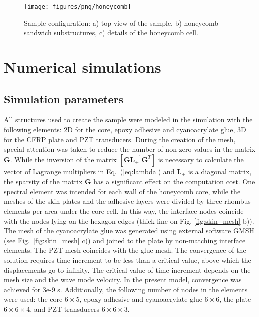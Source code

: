 \documentclass[sensors,article,submit,moreauthors,pdftex]{Definitions/mdpi}
\begin{document}
\begin{figure}
	\begin{center}
		\texttt{[image: figures/png/honeycomb]}
	\end{center}
	\caption{Sample configuration: a) top view of the sample, b) honeycomb sandwich substructures, c) details of the honeycomb cell.}
	\label{fig:honeycomb}
\end{figure}

\section{Numerical simulations}
\label{sec:numerical}
\subsection{Simulation parameters}
\label{sec:simulation}
All structures used to create the sample were modeled in the simulation with the following elements: 2D for the core, epoxy adhesive and cyanoacrylate glue, 3D for the CFRP plate and PZT transducers.
During the creation of the mesh, special attention was taken to reduce the number of non-zero values in the matrix \(\textbf{G}\). While the inversion of the matrix \(\left [\textbf{GL}_+^{-1}\textbf{G}^T\right ]\) is necessary to calculate the vector of Lagrange multipliers in Eq.~(\ref{eq:lambda}) and \(\textbf{L}_+\) is a diagonal matrix, the sparsity of the matrix \(\textbf{G}\) has a significant effect on the computation cost.
One spectral element was intended for each wall of the honeycomb core, while the meshes of the skin plates and the adhesive layers were divided by three rhombus elements per area under the core cell.
In this way, the interface nodes coincide with the nodes lying on the hexagon edges (thick line on Fig. \ref{fig:skin_mesh} b)).
The mesh of the cyanoacrylate glue was generated using external software GMSH \cite{geuzaine2009gmsh} (see Fig.~\ref{fig:skin_mesh} c)) and joined to the plate by non-matching interface elements. The PZT mesh coincides with the glue mesh.
The convergence of the solution requires time increment to be less than a critical value, above which the displacements go to infinity.
The critical value of time increment depends on the mesh size and the wave mode velocity.
In the present model, convergence was achieved for 3e-9 s.
Additionally, the following number of nodes in the elements were used: the core \(6 \times 5\), epoxy adhesive and cyanoacrylate glue \(6 \times 6\), the plate \(6 \times 6 \times 4\), and PZT transducers \(6 \times 6 \times 3\).
\end{document}
